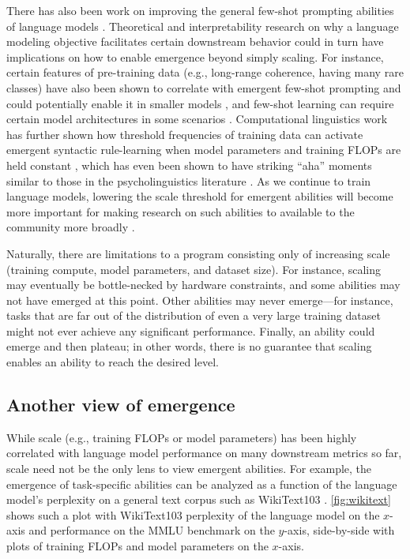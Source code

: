 \documentclass[10pt]{article} %
\begin{document}
There has also been work on improving the general few-shot prompting abilities of language models \citep[][\textit{inter alia}]{gao-etal-2021-making,schick-schutze-2021-just}.
Theoretical and interpretability research \citep{wei2021pretrained,saunshi2020mathematical} on why a language modeling objective facilitates certain downstream behavior could in turn have implications on how to enable emergence beyond simply scaling.
For instance, certain features of pre-training data (e.g., long-range coherence, having many rare classes) have also been shown to correlate with emergent few-shot prompting and could potentially enable it in smaller models \citep{xie2021explanation,chan2022data}, and few-shot learning can require certain model architectures in some scenarios \citep{chan2022data}.
Computational linguistics work has further shown how threshold frequencies of training data can activate emergent syntactic rule-learning when model parameters and training FLOPs are held constant \citep{wei-etal-2021-frequency}, which has even been shown to have striking ``aha'' moments similar to those in the psycholinguistics literature \citep{abend2017bootstrapping,zhang-etal-2021-need}.
As we continue to train language models, lowering the scale threshold for emergent abilities will become more important for making research on such abilities to available to the community more broadly \citep{bommasani2021opportunities,ganguli2022predictability,liang2022community-norms}.

Naturally, there are limitations to a program consisting only of increasing scale (training compute, model parameters, and dataset size).
For instance, scaling may eventually be bottle-necked by hardware constraints, and some abilities may not have emerged at this point.
Other abilities may never emerge---for instance, tasks that are far out of the distribution of even a very large training dataset might not ever achieve any significant performance.
Finally, an ability could emerge and then plateau; in other words, there is no guarantee that scaling enables an ability to reach the desired level.

\subsection{Another view of emergence}\label{subsec:another-view}
While scale (e.g., training FLOPs or model parameters) has been highly correlated with language model performance on many downstream metrics so far, scale need not be the only lens to view emergent abilities.
For example, the emergence of task-specific abilities can be analyzed as a function of the language model's perplexity on a general text corpus such as WikiText103 \citep{merity2016pointer}. 
\cref{fig:wikitext} shows such a plot with WikiText103 perplexity of the language model on the $x$-axis and performance on the MMLU benchmark on the $y$-axis, side-by-side with plots of training FLOPs and model parameters on the $x$-axis. 
\end{document}
